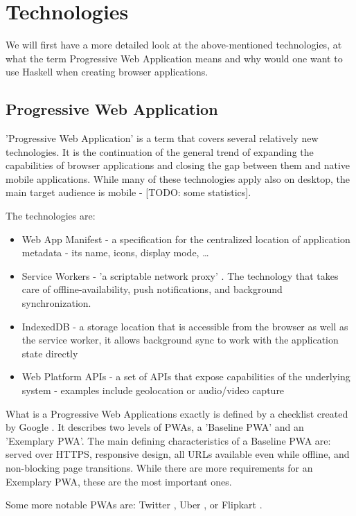 \documentclass[english,odsaz]{fitthesis}
\begin{document}
\chapter{Technologies}
\label{sec:org3077323}
We will first have a more detailed look at the above-mentioned technologies, at
what the term Progressive Web Application means and why would one want to use
Haskell when creating browser applications.

\section{Progressive Web Application}
\label{sec:org5b11da4}
'Progressive Web Application' is a term that covers several relatively new
technologies. It is the continuation of the general trend of expanding the
capabilities of browser applications and closing the gap between them and native
mobile applications. While many of these technologies apply also on desktop, the
main target audience is mobile - [TODO: some statistics].

The technologies are:
\begin{itemize}
\item Web App Manifest - a specification for the centralized location of application
metadata - its name, icons, display mode, \ldots{}
\item Service Workers - 'a scriptable network proxy' \cite{mdn_svcwrk}. The
technology that takes care of offline-availability, push notifications, and
background synchronization.
\item IndexedDB - a storage location that is accessible from the browser as well as
the service worker, it allows background sync to work with the application
state directly
\item Web Platform APIs - a set of APIs that expose capabilities of the underlying
system - examples include geolocation or
audio/video capture \cite{what_web_can_do}
\end{itemize}

What is a Progressive Web Applications exactly is defined by a checklist created
by Google \cite{pwa_checklist}. It describes two levels of PWAs, a 'Baseline PWA'
and an 'Exemplary PWA'. The main defining characteristics of a Baseline PWA are:
served over HTTPS, responsive design, all URLs available even while offline, and
non-blocking page transitions. While there are more requirements for an
Exemplary PWA, these are the most important ones.

Some more notable PWAs are: Twitter \cite{twitter}, Uber \cite{uber}, or Flipkart
\cite{flipkart}.
\end{document}
